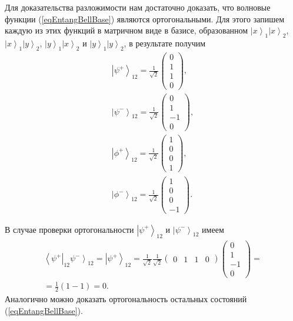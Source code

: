 Для доказательства разложимости нам достаточно доказать, что волновые
функции (\ref{eqEntangBellBase}) являются ортогональными. Для этого
запишем каждую из этих функций в матричном виде в базисе, образованном
$\left|x\right>_1\left|x\right>_2$, $\left|x\right>_1\left|y\right>_2$,
$\left|y\right>_1\left|x\right>_2$ и
$\left|y\right>_1\left|y\right>_2$, в результате получим 
\begin{eqnarray}
  \left|\psi^{+}\right>_{12} = 
  \frac{1}{\sqrt{2}}
  \left(
  \begin{array}{c}
    0 \\
    1 \\
    1 \\
    0
  \end{array}
  \right),
  \nonumber \\
  \left|\psi^{-}\right>_{12} = 
  \frac{1}{\sqrt{2}}
  \left(
  \begin{array}{c}
    0 \\
    1 \\
    -1 \\
    0
  \end{array}
  \right),
  \nonumber \\
  \left|\phi^{+}\right>_{12} = 
  \frac{1}{\sqrt{2}}
  \left(
  \begin{array}{c}
    1 \\
    0 \\
    0 \\
    1
  \end{array}
  \right),
  \nonumber \\
  \left|\phi^{-}\right>_{12} = 
  \frac{1}{\sqrt{2}}
  \left(
  \begin{array}{c}
    1 \\
    0 \\
    0 \\
    -1
  \end{array}
  \right).
  \label{eqEntangBellBaseMatrix}
\end{eqnarray}

В случае проверки ортогональности $\left|\psi^{+}\right>_{12}$ и 
$\left|\psi^{-}\right>_{12}$ имеем
\begin{eqnarray}
\left<\psi^{+}\right|_{12}\left.\psi^{-}\right>_{12} = 
  \left|\psi^{+}\right>_{12} = 
  \frac{1}{\sqrt{2}} \frac{1}{\sqrt{2}}
  \left(
  \begin{array}{cccc}
    0 & 1 & 1 & 0
  \end{array}
  \right)   
  \left(
  \begin{array}{c}
    0 \\
    1 \\
    -1 \\
    0
  \end{array}
  \right) = 
\nonumber \\
=
  \frac{1}{2}\left(1 - 1\right) = 0.
\nonumber 
\end{eqnarray}
Аналогично можно доказать ортогональность остальных состояний
(\ref{eqEntangBellBase}). 

